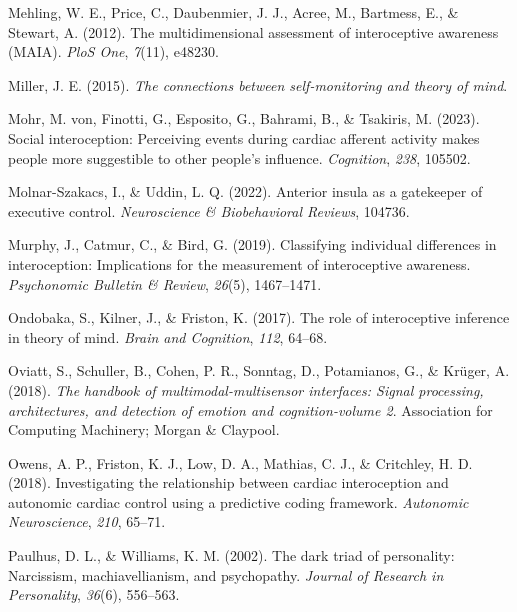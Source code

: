 \documentclass[
  man,mask,floatsintext]{apa6}
\newlength{\cslhangindent}
\newenvironment{CSLReferences}[2] %
 {\begin{list}{}{%
  \setlength{\itemindent}{0pt}
  \setlength{\leftmargin}{0pt}
  \setlength{\parsep}{0pt}
  \ifodd #1
   \setlength{\leftmargin}{\cslhangindent}
   \setlength{\itemindent}{-1\cslhangindent}
  \fi
  \setlength{\itemsep}{#2\baselineskip}}}
 {\end{list}}
\begin{document}
\begin{CSLReferences}{1}{0}
Mehling, W. E., Price, C., Daubenmier, J. J., Acree, M., Bartmess, E., \& Stewart, A. (2012). The multidimensional assessment of interoceptive awareness (MAIA). \emph{PloS One}, \emph{7}(11), e48230.

Miller, J. E. (2015). \emph{The connections between self-monitoring and theory of mind}.

Mohr, M. von, Finotti, G., Esposito, G., Bahrami, B., \& Tsakiris, M. (2023). Social interoception: Perceiving events during cardiac afferent activity makes people more suggestible to other people's influence. \emph{Cognition}, \emph{238}, 105502.

Molnar-Szakacs, I., \& Uddin, L. Q. (2022). Anterior insula as a gatekeeper of executive control. \emph{Neuroscience \& Biobehavioral Reviews}, 104736.

Murphy, J., Catmur, C., \& Bird, G. (2019). Classifying individual differences in interoception: Implications for the measurement of interoceptive awareness. \emph{Psychonomic Bulletin \& Review}, \emph{26}(5), 1467--1471.

Ondobaka, S., Kilner, J., \& Friston, K. (2017). The role of interoceptive inference in theory of mind. \emph{Brain and Cognition}, \emph{112}, 64--68.

Oviatt, S., Schuller, B., Cohen, P. R., Sonntag, D., Potamianos, G., \& Krüger, A. (2018). \emph{The handbook of multimodal-multisensor interfaces: Signal processing, architectures, and detection of emotion and cognition-volume 2}. Association for Computing Machinery; Morgan \& Claypool.

Owens, A. P., Friston, K. J., Low, D. A., Mathias, C. J., \& Critchley, H. D. (2018). Investigating the relationship between cardiac interoception and autonomic cardiac control using a predictive coding framework. \emph{Autonomic Neuroscience}, \emph{210}, 65--71.

Paulhus, D. L., \& Williams, K. M. (2002). The dark triad of personality: Narcissism, machiavellianism, and psychopathy. \emph{Journal of Research in Personality}, \emph{36}(6), 556--563.


\end{CSLReferences}
\end{document}
